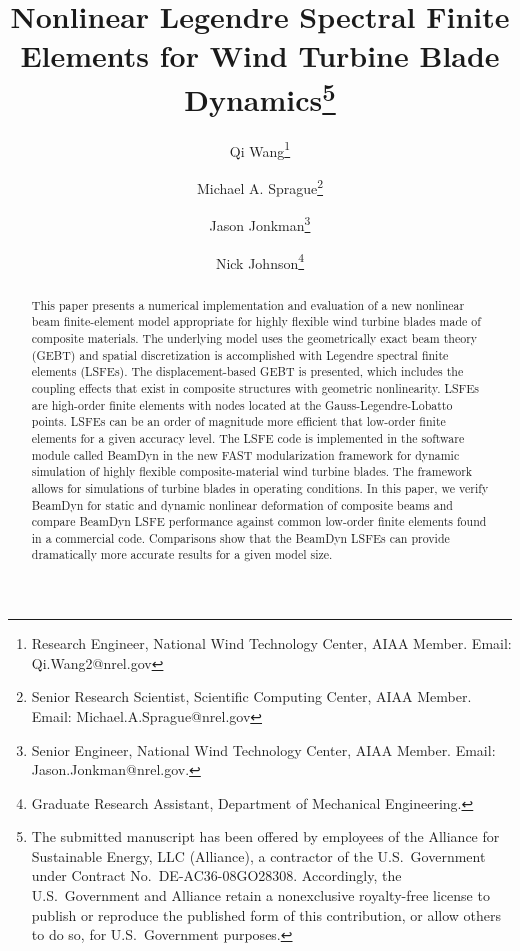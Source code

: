 \documentclass{aiaa-tc}
\title{Nonlinear Legendre Spectral Finite Elements for Wind Turbine Blade
Dynamics\thanks{The submitted manuscript has been offered by employees of
the
Alliance for Sustainable Energy, LLC (Alliance), a contractor of the U.S.\
Government under Contract No.\ DE-AC36-08GO28308.  Accordingly, the U.S.\
Government and Alliance retain a nonexclusive royalty-free license to
publish or reproduce the published form of this contribution, or allow
others to do so, for U.S.\ Government purposes.}}
\author[1]{Qi Wang\thanks{Research Engineer, National Wind Technology Center, AIAA Member. Email: Qi.Wang2@nrel.gov}}
\author[1]{Michael A. Sprague\thanks{Senior Research Scientist, Scientific
Computing Center, AIAA Member. Email: Michael.A.Sprague@nrel.gov}}
\author[1]{Jason Jonkman\thanks{Senior Engineer, National Wind Technology
Center, AIAA Member. Email: Jason.Jonkman@nrel.gov.}}
\author[2]{Nick Johnson\thanks{Graduate Research Assistant, Department of
Mechanical Engineering.}}
\affil[1]{National Renewable Energy Laboratory, Golden, CO 80401}
\affil[2]{Colorado School of Mines, Golden, CO 80401}
\renewcommand{\kill}[1]{\textcolor{red}{\sout{#1}}}
\begin{document}
\maketitle

\begin{abstract}
This paper presents a numerical implementation and evaluation of a new
nonlinear beam finite-element model appropriate for highly flexible
wind turbine blades made of composite materials.  The underlying model uses
the geometrically exact beam theory (GEBT) and spatial discretization is
accomplished with Legendre spectral finite elements (LSFEs).  The
displacement-based GEBT is presented, which includes the coupling effects
that exist in composite structures with geometric nonlinearity.   LSFEs are
high-order finite elements with nodes located at the Gauss-Legendre-Lobatto
points.  LSFEs can be an order of magnitude more efficient that low-order
finite elements for a given accuracy level.    The LSFE code is implemented
in the software module called BeamDyn in the new FAST modularization
framework for dynamic simulation of highly flexible composite-material wind
turbine blades.  The framework allows for simulations of
turbine blades in operating conditions.    In this paper, we verify BeamDyn
for static and dynamic nonlinear deformation of composite beams and compare
BeamDyn LSFE performance against common low-order finite elements found in a
commercial code.    Comparisons show that the BeamDyn LSFEs can provide
dramatically more accurate results for a given model size.
\end{abstract}


\end{document}
